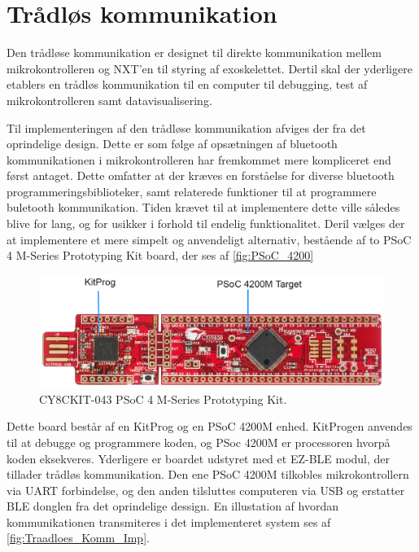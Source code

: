 \section{Trådløs kommunikation}
Den trådløse kommunikation er designet til direkte kommunikation mellem mikrokontrolleren og NXT'en til styring af exoskelettet. Dertil skal der yderligere etablers en trådløs kommunikation til en computer til debugging, test af mikrokontrolleren samt datavisualisering.   

\noindent
Til implementeringen af den trådløse kommunikation afviges der fra det oprindelige design. Dette er som følge af opsætningen af bluetooth kommunikationen i mikrokontrolleren har fremkommet mere kompliceret end først antaget. Dette omfatter at der kræves en forståelse for diverse bluetooth programmeringsbiblioteker, samt relaterede funktioner til at programmere buletooth kommunikation. Tiden krævet til at implementere dette ville således blive for lang, og for usikker i forhold til endelig funktionalitet. Deril vælges der at implementere et mere simpelt og anvendeligt alternativ, bestående af to PSoC 4 M-Series Prototyping Kit board, der ses af \autoref{fig:PSoC_4200}

\begin{figure}[H]
	\centering
	\includegraphics[width=1\textwidth]{figures/PSoC_4200_opdelt}
	\caption{CY8CKIT-043 PSoC 4 M-Series Prototyping Kit\citep{cypress42015}.}
	\label{fig:PSoC_4200}
\end{figure}

Dette board består af en KitProg og en PSoC 4200M enhed. KitProgen anvendes til at debugge og programmere koden, og PSoc 4200M er processoren hvorpå koden eksekveres. Yderligere er boardet udstyret med et EZ-BLE modul, der tillader trådløs kommunikation. 
Den ene PSoC 4200M tilkobles mikrokontrollern via UART forbindelse, og den anden tilsluttes computeren via USB og erstatter BLE donglen fra det oprindelige dessign. En illustation af hvordan kommunikationen transmiteres i det implementeret system ses af \autoref{fig:Traadloes_Komm_Imp}.

